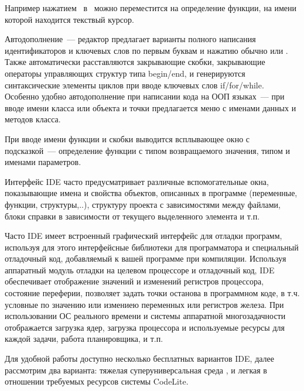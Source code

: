 



\secdown
{}

Например нажатием \ в \eclipse\ можно переместится на
  определение функции, на имени которой находится текствый курсор.
  
    Автодополнение\ --- редактор предлагает варианты полного написания
  идентификаторов и ключевых слов по первым буквам и нажатию обычно
   или . Также автоматически расставляются
  закрывающие скобки, закрывающие операторы управляющих структур типа begin/end,
  и генерируются синтаксические элементы циклов при вводе ключевых слов
  if/for/while. Особенно удобно автодополнение при написании кода на ООП 
  языках\  --- при вводе имени класса или объекта и точки предлагается меню с
  именами данных и методов класса. 
  
  При вводе имени функции и скобки выводится всплывающее окно с подсказкой\ ---
  определение функции с типом возвращаемого значения, типом и именами
  параметров.
  
  Интерфейс IDE часто предусматривает различные вспомогательные окна,
  показывающие имена и свойства объектов, описанных в программе (переменные,
  функции, структуры,..), структуру проекта с зависимостями между файлами, блоки
  справки в зависимости от текущего выделенного элемента и т.п.
  
  Часто IDE имеет встроенный графический интерфейс для отладки программ,
  используя для этого интерфейсные библиотеки для программатора и
  специальный отладочный код, добавляемый к вашей программе при
  компиляции. Используя аппаратный модуль отладки на целевом процессоре и
  отладочный код, IDE обеспечивает отображение значений и изменений регистров
  процессора, состояние переферии, позволяет задать точки останова в программном
  коде, в т.ч. условные по значению или измениею переменных или регистров
  железа.
  При использовании ОС реального времени и системы аппаратной многозадачности
  отображается загрузка ядер, загрузка процессора и используемые ресурсы для
  каждой задачи, работа планировщика, и т.п.
  
Для удобной работы доступно несколько бесплатных вариантов IDE, далее
рассмотрим два варианта: тяжелая суперуниверсальная среда \eclipse, и легкая 
в отношении требуемых ресурсов системы CodeLite.
  
\secup
